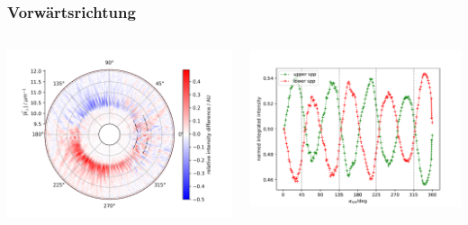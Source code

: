 \documentclass[aspectratio=1610]{beamer}
\begin{document}
			\begin{frame}
				\frametitle{Vorwärtsrichtung}
				\begin{columns}
					\begin{column}{0.5\textwidth}
						\includegraphics[width=\textwidth]{figures/spin_hall/diff_forw.png}
					\end{column}
					\begin{column}{0.5\textwidth}  %
						\includegraphics[width=\textwidth]{figures/spin_hall/intensity_forw.pdf}
					\end{column}
				\end{columns}
			\end{frame}
\end{document}
